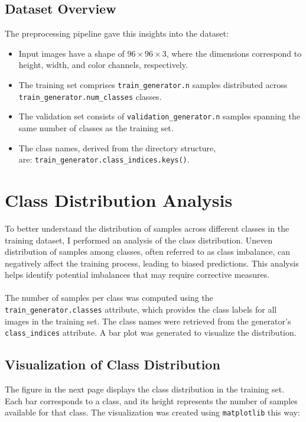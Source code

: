 \documentclass{article}
\begin{document}
\subsection{Dataset Overview}

The preprocessing pipeline gave this insights into the dataset:
\begin{itemize}
    \item Input images have a shape of \(96 \times 96 \times 3\), where the dimensions correspond to height, width, and color channels, respectively.
    \item The training set comprises \texttt{train\_generator.n} samples distributed across \texttt{train\_generator.num\_classes} classes.
    \item The validation set consists of \texttt{validation\_generator.n} samples spanning the same number of classes as the training set.
    \item The class names, derived from the directory structure, \\ are: \texttt{train\_generator.class\_indices.keys()}.
\end{itemize}

\section{Class Distribution Analysis}

To better understand the distribution of samples across different classes in the training dataset, I performed an analysis of the class distribution. Uneven distribution of samples among classes, often referred to as class imbalance, can negatively affect the training process, leading to biased predictions. This analysis helps identify potential imbalances that may require corrective measures.
\\\\
The number of samples per class was computed using the \texttt{train\_generator.classes} attribute, which provides the class labels for all images in the training set. The class names were retrieved from the generator's \texttt{class\_indices} attribute. A bar plot was generated to visualize the distribution.

\subsection{Visualization of Class Distribution}

The figure in the next page displays the class distribution in the training set. Each bar corresponds to a class, and its height represents the number of samples available for that class. The visualization was created using \texttt{matplotlib} this way:
\end{document}
